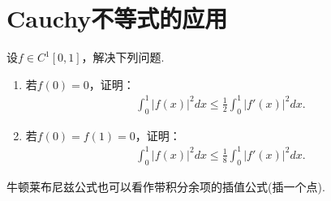 \documentclass[../../main.tex]{subfiles}
\begin{document}
\section{Cauchy不等式的应用}

\begin{example}
设\(f \in C^1[0, 1]\)，解决下列问题.
\begin{enumerate}
\item 若\(f(0) = 0\)，证明：
\begin{align*}
\int_{0}^{1}|f(x)|^{2}dx \leqslant \frac{1}{2}\int_{0}^{1}|f'(x)|^{2}dx.
\end{align*}

\item 若\(f(0) = f(1) = 0\)，证明：
\begin{align*}
\int_{0}^{1}|f(x)|^{2}dx \leqslant \frac{1}{8}\int_{0}^{1}|f'(x)|^{2}dx.
\end{align*}
\end{enumerate}
\end{example}
\begin{remark}
牛顿莱布尼兹公式也可以看作带积分余项的插值公式(插一个点).
\end{remark}
\end{document}
